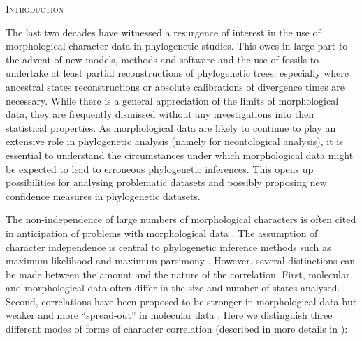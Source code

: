 \documentclass[12pt,letterpaper]{article}
\renewcommand{\section}[1]{%
\bigskip
\begin{center}
\begin{Large}
\normalfont\scshape #1
\medskip
\end{Large}
\end{center}}
\begin{document}
\section{Introduction}
The last two decades have witnessed a resurgence of interest in the use of morphological character data in phylogenetic studies.
This owes in large part to the advent of new models, methods and software \citep{lewisa2001,ronquista2012,Ronquist2012mrbayes,heath2014fossilized} and the use of fossils to undertake at least partial reconstructions of phylogenetic trees, especially where ancestral states reconstructions or absolute calibrations of divergence times are necessary.
While there is a general appreciation of the limits of morphological data, they are frequently dismissed without any investigations into their statistical properties.
As morphological data are likely to continue to play an extensive role in phylogenetic analysis (namely for neontological analysis), it is essential to understand the circumstances under which morphological data might be expected to lead to erroneous phylogenetic inferences.
This opens up possibilities for analysing problematic datasets and possibly proposing new confidence measures in phylogenetic datasets.

The non-independence of large numbers of morphological characters is often cited in anticipation of problems with morphological data \cite[e.g.][]{Davalos01072014, ZouConvergence}.
The assumption of character independence is central to phylogenetic inference methods such as maximum likelihood and maximum parsimony \citep[e.g.][]{joysey1982problems,felsenstein1985phylogenies,lewisa2001,felsenstein2004inferring}.
However, several distinctions can be made between the amount and the nature of the correlation.
First, molecular and morphological data often differ in the size and number of states analysed.
Second, correlations have been proposed to be stronger in morphological data but weaker and more ``spread-out'' in molecular data \citep[][]{huelsenbeck1999effect}.
Here we distinguish three different modes of forms of character correlation (described in more details in \citealt{wilkison1992ordered,wilkinson1995character,wilkinson1995coping}):
\end{document}
